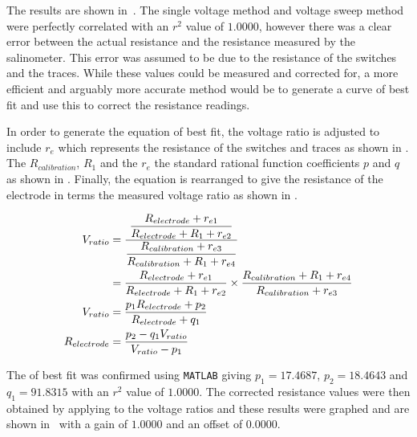 The results are shown in~. 
The single voltage method and voltage sweep method were perfectly correlated with an $r^2$ value of $1.0000$, however there was a clear error between the actual resistance and the resistance measured by the salinometer.
This error was assumed to be due to the resistance of the switches and the traces.
While these values could be measured and corrected for, a more efficient and arguably more accurate method would be to generate a curve of best fit and use this to correct the resistance readings.

In order to generate the equation of best fit, the voltage ratio  is adjusted to include $r_e$ which represents the resistance of the switches and traces as shown in .
The $R_{calibration}$, $R_1$ and the $r_e$ the standard rational function coefficients $p$ and $q$ as shown in .
Finally, the equation is rearranged to give the resistance of the electrode in terms the measured voltage ratio as shown in .

\begin{align}
    V_{ratio} &= \frac{\displaystyle \frac{\displaystyle R_{electrode} + r_{e1}}{\displaystyle R_{electrode} + R_1 + r_{e2}}}{\displaystyle \frac{\displaystyle R_{calibration} + r_{e3}}{\displaystyle R_{calibration} + R_1 + r_{e4}}} \nonumber \\
    &= \frac{\displaystyle R_{electrode} + r_{e1}}{\displaystyle R_{electrode} + R_1 + r_{e2}} \times \frac{\displaystyle R_{calibration} + R_1 + r_{e4}}{\displaystyle R_{calibration} + r_{e3}} \label{eqn:resistance-measuring} \\
    V_{ratio} &= \frac{\displaystyle p_1 R_{electrode} + p_2}{\displaystyle R_{electrode} + q_1} \label{eqn:resistance-measuring-rational} \\
    R_{electrode} &= \frac{\displaystyle p_2 - q_1 V_{ratio}}{\displaystyle V_{ratio} - p_1} \label{eqn:resistance-measuring-rearranged}
\end{align}

The  of best fit was confirmed using \texttt{MATLAB} giving $p_1 = 17.4687$, $p_2 = 18.4643$ and $q_1 = 91.8315$ with an $r^2$ value of $1.0000$. 
The corrected resistance values were then obtained by applying  to the voltage ratios and these results were graphed and are shown in~ with a gain of $1.0000$ and an offset of $0.0000$.